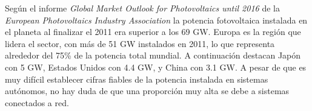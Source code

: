 Según el informe \emph{Global Market Outlook for Photovoltaics until
2016} de la \emph{European Photovoltaics Industry Association}
\citep{EPIA2012} la potencia fotovoltaica instalada en el planeta
al finalizar el 2011 era superior a los 69 GW. Europa es la región
que lidera el sector, con más de 51 GW instalados en 2011, lo que
representa alrededor del 75\% de la potencia total mundial. A
continuación destacan Japón con 5 GW, Estados Unidos con 4.4 GW, y
China con 3.1 GW. A pesar de que es muy difícil establecer
cifras fiables de la potencia instalada en sistemas autónomos, no
hay duda de que una proporción muy alta se debe a sistemas conectados
a red. 

